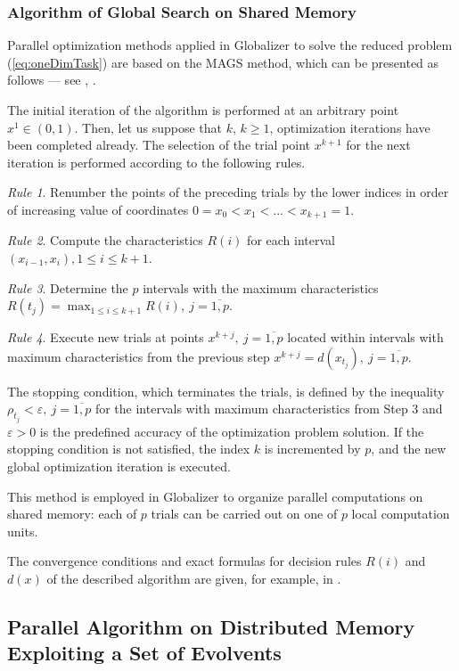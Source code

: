 \documentclass{svproc}
\begin{document}
\subsubsection{Algorithm of Global Search on Shared Memory}
\label{sub:ags}
Parallel optimization methods applied in Globalizer to solve the reduced problem
(\ref{eq:oneDimTask}) are based on the MAGS method, which can be presented as follows ---
see \cite{strongin1978}, \cite{Strongin2000}.
\par
The initial iteration of the algorithm is performed at an arbitrary point \mbox{\(x^1\in(0,1)\)}.
Then, let us suppose that \(k\), \(k\ge 1\), optimization iterations have been completed already.
The selection of the trial point \(x^{k+1}\) for the next iteration is performed according to the
following rules.

\textit{Rule 1}. Renumber the points of the preceding trials by the lower indices in order of
increasing value of coordinates
$0=x_0<x_1<...<x_{k+1}=1$.

\textit{Rule 2}. Compute the characteristics \(R(i)\) for each interval \((x_{i-1},x_i),1\leq i\leq
k+1\).

\textit{Rule 3}. Determine the \(p\) intervals with the maximum characteristics $R(t_j)=\max_{1\leq i
\leq k+1}R(i),\: j=\overline{1,p}$.

\textit{Rule 4}. Execute new trials at points \(x^{k+j},\: j=\overline{1,p}\) located within intervals
with
maximum characteristics from the previous step
  $x^{k+j}=d(x_{t_j}),\: j=\overline{1,p}$.

The stopping condition, which terminates the trials, is defined by the inequality
$\rho_{t_j}<\varepsilon,\: j=\overline{1,p}$
for the intervals with maximum characteristics from Step 3 and \(\varepsilon >0\) is the
predefined accuracy of the optimization problem solution. If the stopping condition is not satisfied,
the index \(k\) is incremented by \(p\), and the new global optimization iteration is executed.

This method is employed in Globalizer to organize parallel computations on shared memory: each of
\(p\)
trials can be carried out on one of \(p\) local computation units.

The convergence conditions and exact formulas for decision rules $R(i)$ and $d(x)$ of the
described algorithm are given, for example, in \cite{Strongin2000}.

\subsection{Parallel Algorithm on Distributed Memory Exploiting a Set of Evolvents}
\label{sub:parallel_evolvents}
\end{document}
